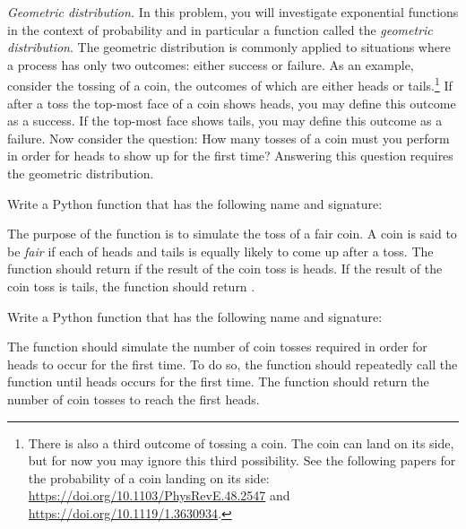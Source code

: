 \documentclass[a4paper,oneside,12pt]{article}
\begin{document}
\begin{problem}
\item\emph{Geometric distribution.}
  In this problem, you will investigate exponential functions in the
  context of probability and in particular a function called the
  \emph{geometric distribution}.  The geometric distribution is
  commonly applied to situations where a process has only two
  outcomes: either success or failure.  As an example, consider the
  tossing of a coin, the outcomes of which are either heads or
  tails.\footnote{
    There is also a third outcome of tossing a coin.  The coin can
    land on its side, but for now you may ignore this third
    possibility.  See the following papers for the probability of a
    coin landing on its side:
    \url{https://doi.org/10.1103/PhysRevE.48.2547} and
    \url{https://doi.org/10.1119/1.3630934}.
  }
  If after a toss the top-most face of a coin shows heads, you may
  define this outcome as a success.  If the top-most face shows tails,
  you may define this outcome as a failure.  Now consider the
  question: How many tosses of a coin must you perform in order for
  heads to show up for the first time?  Answering this question
  requires the geometric distribution.
  \begin{packedenum}
  \item\label{subprob:exponential:coin_simulation_fair_coin}
    Write a Python function that has the following name and signature:
    \begin{center}
    \end{center}
    The purpose of the function  is to simulate the
    toss of a fair coin.  A coin is said to be \emph{fair} if each of
    heads and tails is equally likely to come up after a toss.  The
    function should return  if the result of the coin toss
    is heads.  If the result of the coin toss is tails, the function
    should return .

  \item\label{subprob:exponential:coin_simulation_time_to_heads}
    Write a Python function that has the following name and signature:
    \begin{center}
    \end{center}
    The function  should simulate the number
    of coin tosses required in order for heads to occur for the first
    time.  To do so, the function should repeatedly call the function
     until heads occurs for the first time.  The
    function  should return the number of coin
    tosses to reach the first heads.


\end{packedenum}
\end{problem}
\end{document}
